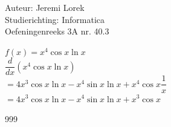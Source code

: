 \documentclass[a4paper]{article}
\begin{document}
  
\noindent \large Auteur: Jeremi Lorek\\
\noindent \large Studierichting: Informatica\\
\noindent \large Oefeningenreeks 3A nr. 40.3\\

\medskip
\normalsize

$f(x) = x^4 \cos x \ln x$  \\

$\dfrac{d}{dx} \left( x^4 \cos x \ln x \right)$  \\

$= 4x^3 \cos x \ln x - x^4 \sin x \ln x + x^4 \cos x \dfrac{1}{x}$  \\

$= 4x^3 \cos x \ln x - x^4 \sin x \ln x + x^3 \cos x$  \\


\begin{thebibliography}{999}
\end{thebibliography}
\end{document}
